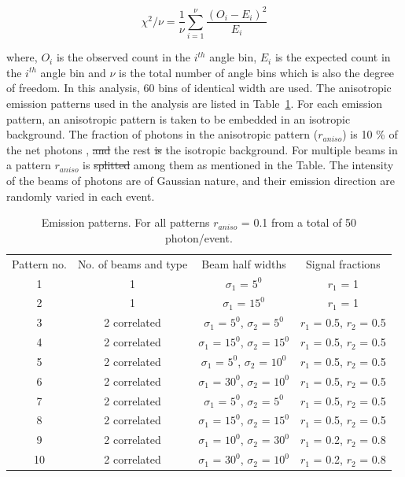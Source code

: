 \begin{equation}
\chi^2/\nu = \frac{1}{\nu} \sum^{\nu}_{i=1} \frac{(O_i - E_i)^2}{E_i}
\label{redchi2}
\end{equation}

where, $O_i$ is the observed count in the $i^{th}$ angle bin, $E_i$ is the expected count in the $i^{th}$ 
angle bin and $\nu$ is the total number of angle bins which is also the degree of freedom. In this analysis, 
60 bins of identical width are used. The anisotropic emission patterns used in the analysis are listed 
in Table~\ref{tab:AnisoPattern}. For each emission pattern,  an anisotropic pattern is taken to be embedded 
in an isotropic background. The fraction of photons in the anisotropic pattern ($r_{aniso}$) is 10 \% of the net photons ,
\sout{and} the rest \sout{is}  the isotropic background. For multiple beams in a pattern $r_{aniso}$ is \sout{splitted}  among them 
as mentioned in the Table. The intensity of the beams of photons are of Gaussian nature, and their emission direction are 
randomly varied in each event.

\begin{table}[h]
  \centering
  \caption{Emission patterns. For all patterns $r_{aniso}$ = 0.1 from a 
  total of 50 photon/event.}
  \label{tab:AnisoPattern}
  \begin{tabular}{|c | c| c | c|}
  \hline
  Pattern no. & No. of beams and type & Beam half widths & Signal fractions \\
  1 & 1 & $\sigma_1$ = $5^{0}$ & $r_1$ = 1 \\
   2 & 1 & $\sigma_1$ = $15^{0}$ & $r_1$ = 1 \\
   3 & 2 correlated & $\sigma_1$ = $5^{0}$, $\sigma_2$ = $5^{0}$ & $r_1$ = 0.5, $r_2$ = 0.5  \\
   4 & 2 correlated & $\sigma_1$ = $15^{0}$, $\sigma_2$ = $15^{0}$ & $r_1$ = 0.5, $r_2$ = 0.5 \\
   5 & 2 correlated & $\sigma_1$ = $5^{0}$, $\sigma_2$ = $10^{0}$ & $r_1$ = 0.5, $r_2$ = 0.5 \\
   6 & 2 correlated & $\sigma_1$ = $30^{0}$, $\sigma_2$ = $10^{0}$ & $r_1$ = 0.5, $r_2$ = 0.5 \\
   7 & 2 correlated & $\sigma_1$ = $5^{0}$, $\sigma_2$ = $5^{0}$ & $r_1$ = 0.5, $r_2$ = 0.5 \\
   8 & 2 correlated & $\sigma_1$ = $15^{0}$, $\sigma_2$ = $15^{0}$ & $r_1$ = 0.5, $r_2$ = 0.5 \\
   9 & 2 correlated & $\sigma_1$ = $10^{0}$, $\sigma_2$ = $30^{0}$ & $r_1$ = 0.2, $r_2$ = 0.8 \\
    10 & 2 correlated & $\sigma_1$ = $30^{0}$, $\sigma_2$ = $10^{0}$ & $r_1$ = 0.2, $r_2$ = 0.8 \\
  \hline
 \end{tabular}
\end{table}

